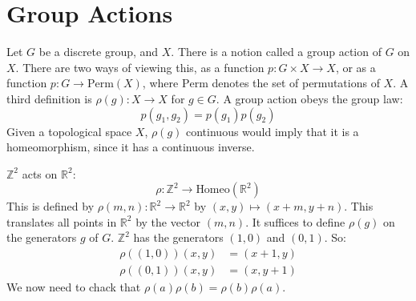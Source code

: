 \documentclass[crop=false,class=book,oneside]{standalone}
\begin{document}
    \section{Group Actions}
        Let $G$ be a discrete group, and $X$. There is a notion
        called a group action of $G$ on $X$. There are two ways
        of viewing this, as a function
        $p:G\times{X}\rightarrow{X}$, or as a function
        $p:G\rightarrow\textrm{Perm}(X)$, where $\textrm{Perm}$
        denotes the set of permutations of $X$. A third definition
        is $\rho(g):X\rightarrow{X}$ for $g\in{G}$.
        A group action obeys the group law:
        \begin{equation}
            p(g_{1},g_{2})=p(g_{1})p(g_{2})
        \end{equation}
        Given a topological space $X$, $\rho(g)$ continuous
        would imply that it is a homeomorphism, since it has
        a continuous inverse.
        \begin{lexample}
            $\mathbb{Z}^{2}$ acts on $\mathbb{R}^{2}$:
            \begin{equation}
                \rho:\mathbb{Z}^{2}\rightarrow
                \textrm{Homeo}(\mathbb{R}^{2})
            \end{equation}
            This is defined by
            $\rho(m,n):\mathbb{R}^{2}\rightarrow\mathbb{R}^{2}$
            by $(x,y)\mapsto(x+m,y+n)$. This translates all points
            in $\mathbb{R}^{2}$ by the vector $(m,n)$. It suffices
            to define $\rho(g)$ on the generators $g$ of $G$.
            $\mathbb{Z}^{2}$ has the generators $(1,0)$ and $(0,1)$.
            So:
            \begin{subequations}
                \begin{align}
                    \rho((1,0))(x,y)&=(x+1,y)\\
                    \rho((0,1))(x,y)&=(x,y+1)
                \end{align}
            \end{subequations}
            We now need to chack that
            $\rho(a)\rho(b)=\rho(b)\rho(a)$.
        \end{lexample}
\end{document}
